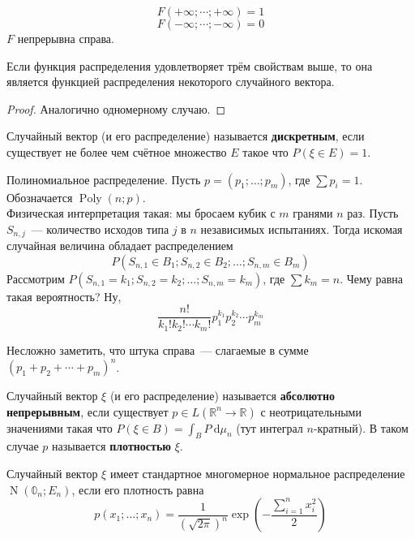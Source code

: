 \documentclass{article}
\begin{document}
    \begin{property}
        $$F(+\infty;\cdots;+\infty)=1$$
        $$F(-\infty;\cdots;-\infty)=0$$
        $F$ непрерывна справа.
    \end{property}
    \begin{theorem}
        Если функция распределения удовлетворяет трём свойствам выше, то она является функцией распределения некоторого случайного вектора.
    \end{theorem}
    \begin{proof}
        Аналогично одномерному случаю.
    \end{proof}
    \begin{definition}
        Случайный вектор (и его распределение) называется \textbf{дискретным}, если существует не более чем счётное множество $E$ такое что $P(\xi\in E)=1$.
    \end{definition}
    \begin{example}
        Полиномиальное распределение. Пусть $p=(p_1;\ldots;p_m)$, где $\sum p_i=1$. Обозначается $\operatorname{Poly}(n;p)$.\\
        Физическая интерпретация такая: мы бросаем кубик с $m$ гранями $n$ раз. Пусть $S_{n,j}$~--- количество исходов типа $j$ в $n$ независимых испытаниях. Тогда искомая случайная величина обладает распределением
        $$
        P(S_{n,1}\in B_1;S_{n,2}\in B_2;\ldots;S_{n,m}\in B_m)
        $$
        Рассмотрим $P(S_{n,1}=k_1;S_{n,2}=k_2;\ldots;S_{n,m}=k_m)$, где $\sum k_m=n$. Чему равна такая вероятность? Ну,
        $$
        \frac{n!}{k_1!k_2!\cdots k_m!}p_1^{k_1}p_2^{k_2}\cdots p_m^{k_m}
        $$
    \end{example}
    \begin{remark}
        Несложно заметить, что штука справа~--- слагаемые в сумме $(p_1+p_2+\cdots+p_m)^n$.
    \end{remark}
    \begin{definition}
        Случайный вектор $\xi$ (и его распределение) называется \textbf{абсолютно непрерывным}, если существует $p\in L(\mathbb R^n\to\mathbb R)$ с неотрицательными значениями такая что $P(\xi\in B)=\int_BP~\mathrm d\mu_n$ (тут интеграл $n$-кратный). В таком случае $p$ называется \textbf{плотностью} $\xi$.
    \end{definition}
    \begin{example}
        Случайный вектор $\xi$ имеет стандартное многомерное нормальное распределение $\operatorname{N}(\mathbb0_n;E_n)$, если его плотность равна
        $$
        p(x_1;\ldots;x_n)=\frac1{(\sqrt{2\pi})^n}\exp\left(-\frac{\sum\limits_{i=1}^nx_i^2}2\right)
        $$
    \end{example}
\end{document}

